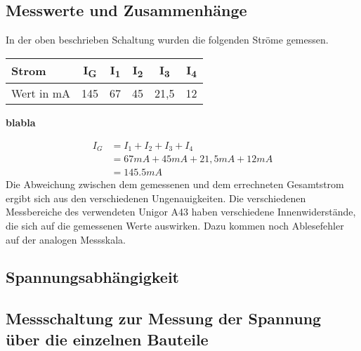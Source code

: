 \documentclass[
a4paper,     %
 headsepline, %
11pt         %
]{scrartcl}  %
\begin{document}
\subsection{Messwerte und Zusammenhänge}

In der oben beschrieben Schaltung wurden die folgenden Ströme gemessen.
\begin{center}
  \begin{tabular}{ l | c | c | c | c | c}
    \hline
    Strom      & I\textsubscript{G} & I\textsubscript{1} & I\textsubscript{2} & I\textsubscript{3} & I\textsubscript{4}  \\ \hline
    Wert in mA & 145 & 67 & 45 & 21,5 & 12 \\
    \hline
  \end{tabular}
\end{center}

\textbf{blabla}

\begin{align}
I_G &= I_1 + I_2 + I_3 + I_4 \nonumber \\
    &= 67mA + 45mA + 21,5mA + 12mA \nonumber \\
    &= 145.5 mA \nonumber
\end{align}
Die Abweichung zwischen dem gemessenen und dem errechneten Gesamtstrom ergibt sich aus den verschiedenen Ungenauigkeiten. 
Die verschiedenen Messbereiche des verwendeten Unigor A43 haben verschiedene Innenwiderstände, die sich auf die gemessenen Werte auswirken. 
Dazu kommen noch Ablesefehler auf der analogen Messskala.

\subsection{Spannungsabhängigkeit}
\subsection{Messschaltung zur Messung der Spannung über die einzelnen Bauteile}
\end{document}
